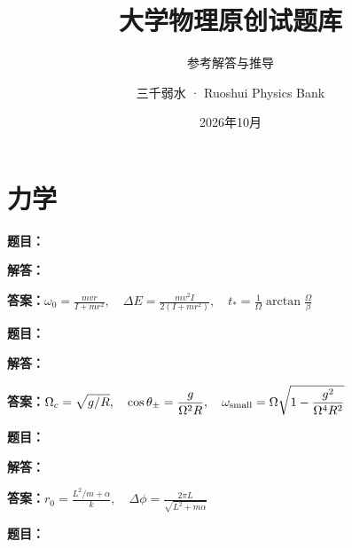 \documentclass[lang=cn,color=blue,11pt]{elegantbook}
\title{大学物理原创试题库}
\subtitle{参考解答与推导}
\author{三千弱水 · Ruoshui Physics Bank}
\date{2026年10月}
\begin{document}
\maketitle
\tableofcontents
\mainmatter
\chapter{力学}

\par
\noindent\textbf{题目：}
\par\noindent\textbf{解答：}
\par\noindent\textbf{答案：}\(\displaystyle \omega_0=\frac{mvr}{I+mr^2},\quad \Delta E=\frac{mv^2I}{2(I+mr^2)},\quad t_*=\frac1\Omega\arctan\frac\Omega\beta\)\par
\par\smallskip\noindent\hrulefill\par\medskip
{}\par
\noindent\textbf{题目：}
\par\noindent\textbf{解答：}
\par\noindent\textbf{答案：}\(\displaystyle \Omega_c=\sqrt{g/R},\quad \cos\theta_\pm=\frac{g}{\Omega^2R},\quad \omega_{\rm small}=\Omega\sqrt{1-\frac{g^2}{\Omega^4R^2}}\)\par
\par\smallskip\noindent\hrulefill\par\medskip
{}\par
\noindent\textbf{题目：}
\par\noindent\textbf{解答：}
\par\noindent\textbf{答案：}\(\displaystyle r_0=\frac{L^2/m+\alpha}{k},\quad \Delta\phi=\frac{2\pi L}{\sqrt{L^2+m\alpha}}\)\par
\par\smallskip\noindent\hrulefill\par\medskip
{}\par
\noindent\textbf{题目：}
\end{document}
